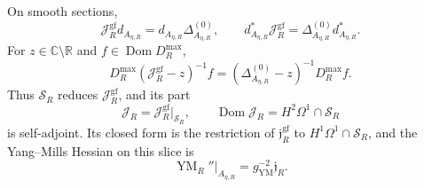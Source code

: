 \begin{proposition}
\label{cusp-native-full-flux-Coulomb-reduction}
On smooth sections,
\begin{equation}
 \mathcal J_R^{\mathrm{gf}}d_{A_{\eta,R}}
 =d_{A_{\eta,R}}\Delta_{A_{\eta,R}}^{(0)},
 \qquad
 d_{A_{\eta,R}}^*\mathcal J_R^{\mathrm{gf}}
 =\Delta_{A_{\eta,R}}^{(0)}d_{A_{\eta,R}}^*.
 \label{cusp-native-full-flux-formal-intertwining}
\end{equation}
For \(z\in\mathbb C\setminus\mathbb R\) and
\(f\in\operatorname{Dom}D_R^{\max}\),
\begin{equation}
 D_R^{\max}(\mathcal J_R^{\mathrm{gf}}-z)^{-1}f
 =(\Delta_{A_{\eta,R}}^{(0)}-z)^{-1}D_R^{\max}f.
 \label{cusp-native-full-flux-resolvent-intertwining}
\end{equation}
Thus \(\mathscr S_R\) reduces \(\mathcal J_R^{\mathrm{gf}}\), and its part
\begin{equation}
 \mathcal J_R=\mathcal J_R^{\mathrm{gf}}\big|_{\mathscr S_R},
 \qquad
 \operatorname{Dom}\mathcal J_R=H^2\Omega^1\cap\mathscr S_R
 \label{cusp-native-full-flux-Coulomb-operator}
\end{equation}
is self-adjoint.  Its closed form is the restriction of
\(\mathfrak j_R^{\mathrm{gf}}\) to \(H^1\Omega^1\cap\mathscr S_R\), and the
Yang--Mills Hessian on this slice is
\begin{equation}
 \operatorname{YM}_R''\big|_{A_{\eta,R}}
 =g_{\mathrm{YM}}^{-2}\mathfrak j_R.
 \label{cusp-native-full-flux-Coulomb-Hessian}
\end{equation}
\end{proposition}

